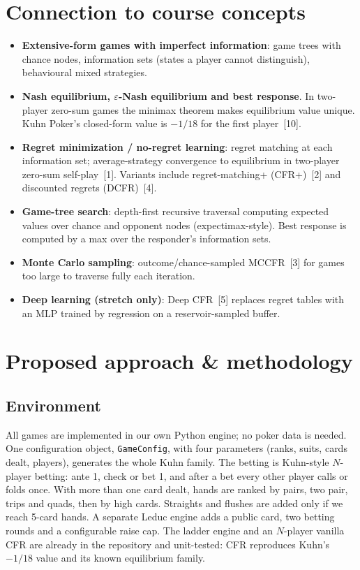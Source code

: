 \documentclass[10pt,a4paper]{article}
\newcommand{\eps}{\varepsilon}
\begin{document}
\section{Connection to course concepts}
\begin{itemize}
  \item \textbf{Extensive-form games with imperfect information}: game trees with chance nodes, information sets (states a player cannot distinguish), behavioural mixed strategies.
  \item \textbf{Nash equilibrium, $\eps$-Nash equilibrium and best response}. In two-player zero-sum games the minimax theorem makes equilibrium value unique. Kuhn Poker's closed-form value is $-1/18$ for the first player~[10].
  \item \textbf{Regret minimization / no-regret learning}: regret matching at each information set; average-strategy convergence to equilibrium in two-player zero-sum self-play~[1]. Variants include regret-matching+ (CFR+)~[2] and discounted regrets (DCFR)~[4].
  \item \textbf{Game-tree search}: depth-first recursive traversal computing expected values over chance and opponent nodes (expectimax-style). Best response is computed by a max over the responder's information sets.
  \item \textbf{Monte Carlo sampling}: outcome/chance-sampled MCCFR~[3] for games too large to traverse fully each iteration.
  \item \textbf{Deep learning (stretch only)}: Deep CFR~[5] replaces regret tables with an MLP trained by regression on a reservoir-sampled buffer.
\end{itemize}

\section{Proposed approach \& methodology}

\subsection{Environment}
All games are implemented in our own Python engine; no poker data is needed. One configuration object, \texttt{GameConfig}, with four parameters (ranks, suits, cards dealt, players), generates the whole Kuhn family. The betting is Kuhn-style $N$-player betting: ante 1, check or bet 1, and after a bet every other player calls or folds once. With more than one card dealt, hands are ranked by pairs, two pair, trips and quads, then by high cards. Straights and flushes are added only if we reach 5-card hands. A separate Leduc engine adds a public card, two betting rounds and a configurable raise cap. The ladder engine and an $N$-player vanilla CFR are already in the repository and unit-tested: CFR reproduces Kuhn's $-1/18$ value and its known equilibrium family.
\end{document}
